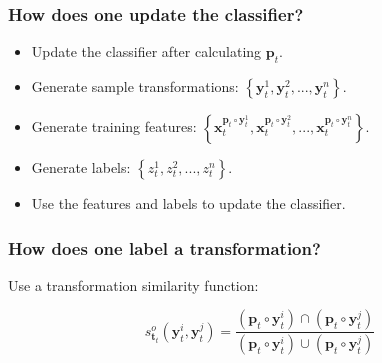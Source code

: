 \begin{frame}
    \frametitle{How does one update the classifier?}

    \begin{itemize}
        \item Update the classifier after calculating \(\mathbf{p}_t\).
        \item Generate sample transformations: \(\left\{ \mathbf{y}_t^1,
            \mathbf{y}_t^2, ..., \mathbf{y}_t^n \right\}\).
        \item Generate training features: \(\left\{
                \mathbf{x}_t^{\mathbf{p}_t \circ \mathbf{y}_t^1},
                \mathbf{x}_t^{\mathbf{p}_t \circ \mathbf{y}_t^2}, ...,
                \mathbf{x}_t^{\mathbf{p}_t \circ \mathbf{y}_t^n} \right\}\).
        \item Generate labels: \(\left\{ z_t^1, z_t^2, ..., z_t^n \right\}\).
        \item Use the features and labels to update the classifier.
    \end{itemize}
\end{frame}

\begin{frame}
    \frametitle{How does one label a transformation?}
    Use a transformation similarity function:

    \begin{equation}
        s_{\mathbf{t}_t}^o \left( \mathbf{y}_t^i, \mathbf{y}_t^j \right) =
            \frac{\left( \mathbf{p}_t \circ \mathbf{y}_t^i \right) \cap \left( \mathbf{p}_t \circ \mathbf{y}_t^j \right)}
                 {\left( \mathbf{p}_t \circ \mathbf{y}_t^i \right) \cup \left( \mathbf{p}_t \circ \mathbf{y}_t^j \right)}
    \end{equation}


\end{frame}

